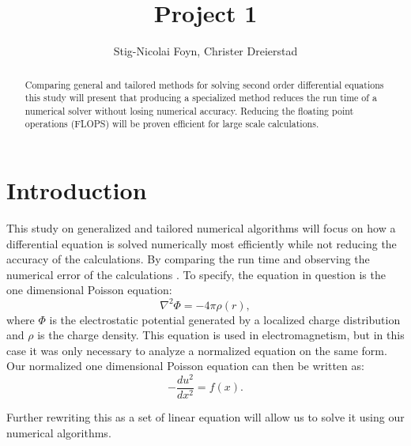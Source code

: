 \documentclass{emulateapj}
\begin{document}
\title{Project 1}

\author{Stig-Nicolai Foyn, Christer Dreierstad}





\begin{abstract}
Comparing general and tailored methods for solving second order differential equations this study will present that producing a specialized method reduces the run time of a numerical solver without losing numerical accuracy. Reducing the floating point operations (FLOPS) will be proven efficient for large scale calculations.

\end{abstract}

\section{Introduction}
\label{sec:introduction}
This study on generalized and tailored numerical algorithms will focus on how a differential equation is solved numerically most efficiently while not reducing the accuracy of the calculations. By comparing the run time and observing the numerical error of the calculations . To specify, the equation in question is the one dimensional Poisson equation:
%
\begin{equation*}
    {\nabla^{2}} \Phi = -4\pi \rho(r),
\end{equation*}
%
where $\Phi$ is the electrostatic potential generated by a localized charge distribution and $\rho$ is the charge density. This equation is used in electromagnetism, but in this case it was only necessary to analyze a normalized equation on the same form. Our normalized one dimensional Poisson equation can then be written as:
%
\begin{equation}\label{eq:-u''}
    -\frac{du^2}{dx^2} = f(x).
\end{equation}

Further rewriting this as a set of linear equation will allow us to solve it using our numerical algorithms.
\end{document}
